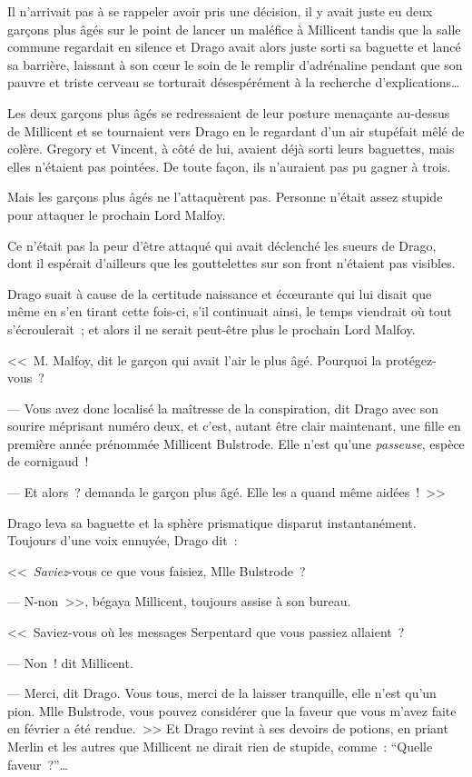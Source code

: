 Il n'arrivait pas à se rappeler avoir pris une décision, il y avait juste eu deux garçons plus âgés sur le point de lancer un maléfice à Millicent tandis que la salle commune regardait en silence et Drago avait alors juste sorti sa baguette et lancé sa barrière, laissant à son cœur le soin de le remplir d'adrénaline pendant que son pauvre et triste cerveau se torturait désespérément à la recherche d'explications…

Les deux garçons plus âgés se redressaient de leur posture menaçante au-dessus de Millicent et se tournaient vers Drago en le regardant d'un air stupéfait mêlé de colère. Gregory et Vincent, à côté de lui, avaient déjà sorti leurs baguettes, mais elles n'étaient pas pointées. De toute façon, ils n'auraient pas pu gagner à trois.

Mais les garçons plus âgés ne l'attaquèrent pas. Personne n'était assez stupide pour attaquer le prochain Lord Malfoy.

Ce n'était pas la peur d'être attaqué qui avait déclenché les sueurs de Drago, dont il espérait d'ailleurs que les gouttelettes sur son front n'étaient pas visibles.

Drago suait à cause de la certitude naissance et écœurante qui lui disait que même en s'en tirant cette fois-ci, s'il continuait ainsi, le temps viendrait où tout s'écroulerait~; et alors il ne serait peut-être plus le prochain Lord Malfoy.

<<~M. Malfoy, dit le garçon qui avait l'air le plus âgé. Pourquoi la protégez-vous~?

--- Vous avez donc localisé la maîtresse de la conspiration, dit Drago avec son sourire méprisant numéro deux, et c'est, autant être clair maintenant, une fille en première année prénommée Millicent Bulstrode. Elle n'est qu'une \emph{passeuse}, espèce de cornigaud~!

--- Et alors~? demanda le garçon plus âgé. Elle les a quand même aidées~!~>>

Drago leva sa baguette et la sphère prismatique disparut instantanément. Toujours d'une voix ennuyée, Drago dit~:

<<~\emph{Saviez}-vous ce que vous faisiez, Mlle Bulstrode~?

--- N-non~>>, bégaya Millicent, toujours assise à son bureau.

<<~Saviez-vous où les messages Serpentard que vous passiez allaient~?

--- Non~! dit Millicent.

--- Merci, dit Drago. Vous tous, merci de la laisser tranquille, elle n'est qu'un pion. Mlle Bulstrode, vous pouvez considérer que la faveur que vous m'avez faite en février a été rendue.~>> Et Drago revint à ses devoirs de potions, en priant Merlin et les autres que Millicent ne dirait rien de stupide, comme~: “Quelle faveur~?”…

